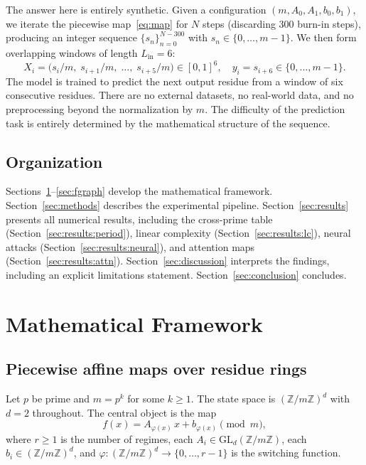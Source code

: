 \documentclass[11pt]{article}
\theoremstyle{plain}
\theoremstyle{definition}
\newcommand{\Z}{\mathbb{Z}}
\newcommand{\GL}{\mathrm{GL}}
\begin{document}
The answer here is entirely synthetic. Given a configuration $(m, A_0, A_1, b_0, b_1)$, we iterate the piecewise map~\eqref{eq:map} for $N$ steps (discarding 300 burn-in steps), producing an integer sequence $\{s_n\}_{n=0}^{N-300}$ with $s_n \in \{0,\ldots,m-1\}$. We then form overlapping windows of length $L_{\mathrm{in}} = 6$:
\[
  X_i = \bigl(s_i/m,\; s_{i+1}/m,\; \ldots,\; s_{i+5}/m\bigr) \in [0,1]^6,\quad y_i = s_{i+6} \in \{0,\ldots,m-1\}.
\]
The model is trained to predict the next output residue from a window of six consecutive residues. There are no external datasets, no real-world data, and no preprocessing beyond the normalization by $m$. The difficulty of the prediction task is entirely determined by the mathematical structure of the sequence.

\subsection{Organization}

Sections~\ref{sec:framework}--\ref{sec:fgraph} develop the mathematical framework. Section~\ref{sec:methods} describes the experimental pipeline. Section~\ref{sec:results} presents all numerical results, including the cross-prime table (Section~\ref{sec:results:period}), linear complexity (Section~\ref{sec:results:lc}), neural attacks (Section~\ref{sec:results:neural}), and attention maps (Section~\ref{sec:results:attn}). Section~\ref{sec:discussion} interprets the findings, including an explicit limitations statement. Section~\ref{sec:conclusion} concludes.

\section{Mathematical Framework}
\label{sec:framework}

\subsection{Piecewise affine maps over residue rings}

Let $p$ be prime and $m = p^k$ for some $k \geq 1$. The state space is $(\Z/m\Z)^d$ with $d = 2$ throughout. The central object is the map
\begin{equation}
  \label{eq:map}
  f(x) = A_{\varphi(x)}\,x + b_{\varphi(x)} \pmod{m},
\end{equation}
where $r \geq 1$ is the number of regimes, each $A_i \in \GL_d(\Z/m\Z)$, each $b_i \in (\Z/m\Z)^d$, and $\varphi\colon (\Z/m\Z)^d \to \{0,\ldots,r-1\}$ is the switching function.
\end{document}
